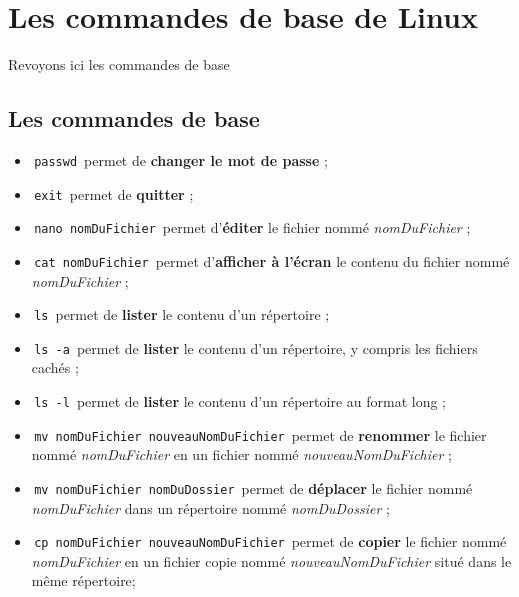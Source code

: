 \documentclass[11pt,a4paper]{article}
\begin{document}
            \section{Les commandes de base de Linux}Revoyons ici les commandes de base\subsection{Les commandes de base}
					\begin{itemize}
				
			\item \,\verb|passwd|\, permet de \textbf{changer le mot de passe } ; 
        
			\item \,\verb|exit|\, permet de \textbf{quitter} ; 
        
			\item \,\verb|nano nomDuFichier|\, 
          permet d'\textbf{\'editer} le fichier 
          nomm\'e \textit{nomDuFichier} ; 
        
			\item \,\verb|cat nomDuFichier|\, 
          permet d'\textbf{afficher \`a l'\'ecran} le contenu du fichier 
          nomm\'e \textit{nomDuFichier} ; 
        
			\item \,\verb|ls|\, permet de \textbf{lister} le contenu d'un r\'epertoire ; 
        
			\item \,\verb|ls -a|\, permet de \textbf{lister} le contenu d'un r\'epertoire, y compris les fichiers cach\'es ; 
        
			\item \,\verb|ls -l|\, permet de \textbf{lister} le contenu d'un r\'epertoire au format long ; 
        
			\item \,\verb|mv nomDuFichier nouveauNomDuFichier|\, 
          permet de \textbf{renommer} le fichier nomm\'e \textit{nomDuFichier}
          en un fichier nomm\'e \textit{nouveauNomDuFichier} ; 
        
			\item \,\verb|mv nomDuFichier nomDuDossier|\, 
          permet de \textbf{d\'eplacer} le fichier nomm\'e \textit{nomDuFichier}
          dans un r\'epertoire nomm\'e \textit{nomDuDossier} ; 
        
			\item \,\verb|cp nomDuFichier nouveauNomDuFichier|\, 
          permet de \textbf{copier} le fichier nomm\'e \textit{nomDuFichier}
          en un fichier copie  nomm\'e \textit{nouveauNomDuFichier} situ\'e dans le m\^eme r\'epertoire; 
        

\end{itemize}
\end{document}
